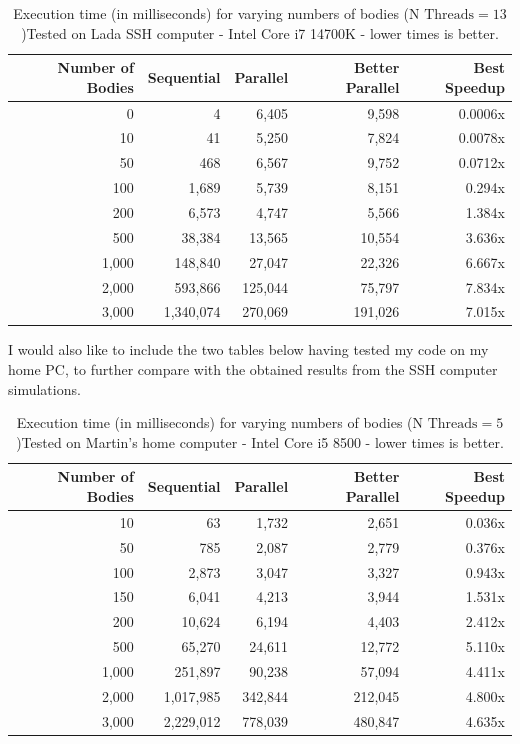 \documentclass{article}
\begin{document}
\begin{table}[htbp]
\centering
\begin{tabular}{|r|r|r|r|r|}
\hline
\textbf{Number of Bodies} & \textbf{Sequential} & \textbf{Parallel} & \textbf{Better Parallel} & \textbf{Best Speedup}\\
\hline
0      & 4         & 6,405   & 9,598    & 0.0006x \\
10     & 41        & 5,250   & 7,824    & 0.0078x \\
50     & 468       & 6,567   & 9,752    & 0.0712x \\
100    & 1,689     & 5,739   & 8,151    & 0.294x \\
200    & 6,573     & 4,747   & 5,566    & 1.384x \\ 
500    & 38,384    & 13,565  & 10,554   & 3.636x \\
1,000  & 148,840   & 27,047  & 22,326   & 6.667x \\
2,000  & 593,866   & 125,044 & 75,797   & 7.834x \\
3,000  & 1,340,074 & 270,069 & 191,026  & 7.015x \\
\hline
\end{tabular}
\caption{Execution time (in milliseconds) for varying numbers of bodies ($\text{N Threads} = 13$)Tested on Lada SSH computer - Intel Core i7 14700K - lower times is better.}
\label{tab:thread_performance}
\end{table}

I would also like to include the two tables below having tested my code on my home PC, to further compare with the obtained results from the SSH computer simulations.

\begin{table}[htbp]
\centering
\begin{tabular}{|r|r|r|r|r|}
\hline
\textbf{Number of Bodies} & \textbf{Sequential} & \textbf{Parallel} & \textbf{Better Parallel} & \textbf{Best Speedup}\\
\hline
10      & 63        & 1,732     & 2,651   & 0.036x   \\
50      & 785       & 2,087     & 2,779   & 0.376x   \\
100     & 2,873     & 3,047     & 3,327   & 0.943x   \\
150     & 6,041     & 4,213     & 3,944   & 1.531x \\
200     & 10,624    & 6,194     & 4,403   & 2.412x \\ 
500     & 65,270    & 24,611    & 12,772  & 5.110x  \\
1,000   &  251,897  & 90,238    & 57,094  & 4.411x   \\
2,000   & 1,017,985 & 342,844   & 212,045 & 4.800x \\
3,000   & 2,229,012 & 778,039   & 480,847 & 4.635x \\
\hline
\end{tabular}
\caption{Execution time (in milliseconds) for varying numbers of bodies ($\text{N Threads} = 5$)Tested on Martin's home computer - Intel Core i5 8500 - lower times is better.}
\label{tab:thread_performance}
\end{table}
\end{document}
